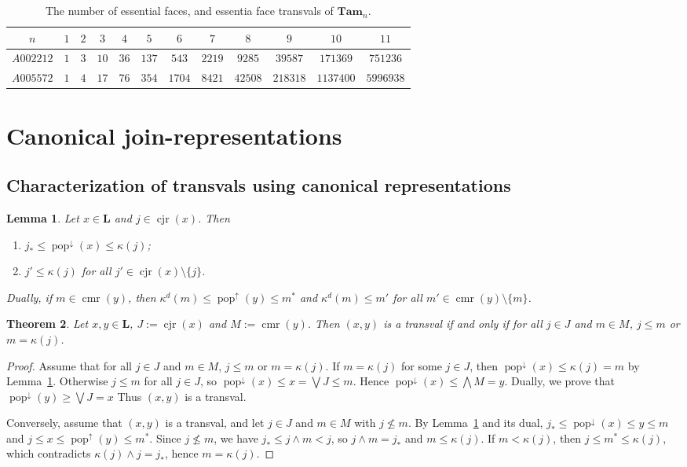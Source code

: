 \documentclass[leqno, 12pt]{amsart}
\numberwithin{equation}{section}
\newcommand{\Tam}{\mathbf{Tam}}
\renewcommand{\L}{\mathbf L}
\newcommand{\popdown}{\operatorname{pop}^\downarrow}
\newcommand{\popup}{\operatorname{pop}^\uparrow}
\newcommand{\cjr}{\operatorname{cjr}}
\newcommand{\cmr}{\operatorname{cmr}}
\numberwithin{equation}{section}
\newtheorem{thm}{Theorem}[section]
\newtheorem{lem}[thm]{Lemma}
\theoremstyle{remark}
\begin{document}
	\begin{table}[H]
		\centering
		\begin{tabular}{cccccccccccc}
		\toprule
		   $n$ & $1$& $2$ &$3$ & $4$ & $5$ & $6$ & $7$ & $8$ & $9$ & $10$ & $11$  \\ \midrule 
		  $A002212$ & $1$ & $3$ & $10$ & $36$ & $137$ & $543$ & $2219$ & $9285$ &$39587$ & $171369$ & $751236$ \\ \midrule 
		    $A005572$ & $1$ & $4$ & $17$ & $76$ & $354$ & $1704$ & $8421$ & $42508$ & $218318$ & $1137400$ & $5996938$ \\  \bottomrule
		\end{tabular}
		\caption{\centering The number of essential faces, and essentia face transvals of $\Tam_n$.}
	\end{table}

\section{Canonical join-representations}
\label{sec:trv_cjr}

\subsection{Characterization of transvals using canonical representations}

\begin{lem}\label{lem:popdown_cjr}
Let $x\in\L$ and $j\in \cjr(x)$. Then
\begin{enumerate}
\item $j_*\le\popdown(x)\le\kappa(j)$;
\item $j'\le\kappa(j)$ for all $j'\in\cjr(x)\setminus\{j\}$.
\end{enumerate}
Dually, if $m\in\cmr(y)$, then $\kappa^d(m)\le\popup(y)\le m^*$ and $\kappa^d(m)\le m'$ for all $m'\in\cmr(y)\setminus\{m\}$.
\end{lem}

\begin{thm}
  Let $x,y\in\L$, $J:=\operatorname{cjr}(x)$ and $M:=\operatorname{cmr}(y)$. Then $(x,y)$ is a transval if and only if for all $j\in J $ and $m\in M$, $j\le m$ or $m=\kappa(j)$.
\end{thm}
\begin{proof}
  Assume that for all $j\in J $ and $m\in M$, $j\le m$ or $m=\kappa(j)$. If $m=\kappa(j)$ for some $j\in J$, then $\popdown(x)\le\kappa(j)=m$ by  Lemma~\ref{lem:popdown_cjr}. Otherwise $j\le m$ for all $j\in J$, so  $\popdown(x)\le x=\bigvee J\le m$. Hence $\popdown(x)\le\bigwedge M=y$. Dually, we prove that $\popdown(y)\ge \bigvee J=x$ Thus $(x,y)$ is a transval.
  
  Conversely, assume that $(x,y)$ is a transval, and let $j\in J$ and $m\in M$ with $j\nleq m$. By Lemma~\ref{lem:popdown_cjr} and its dual, $ j_*\le\popdown(x)\le y\le m$ and $j\le x\le\popup(y)\le m^*$. 
  Since $j\nleq m$, we have $j_*\le j\wedge m < j$, so $j\wedge m = j_*$ and $m\le \kappa(j)$. If $m< \kappa(j)$, then $j\le m^* \le \kappa(j)$, which contradicts $\kappa(j)\wedge j=j_*$, hence $m=\kappa(j)$.
  \end{proof}
  
\end{document}

